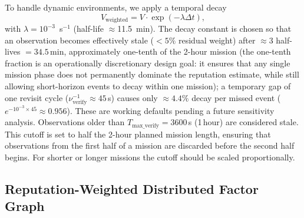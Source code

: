 \documentclass[journal,10pt,twocolumn]{IEEEtran}
\begin{document}
To handle dynamic environments, we apply a temporal decay
\begin{equation}
\label{eq:temporal-decay}
V_\text{weighted} = V \cdot \exp(-\lambda \Delta t),
\end{equation}
with $\lambda = 10^{-3}$~s$^{-1}$ (half-life $\approx$11.5~min). The decay constant is chosen so that an observation becomes effectively stale ($<5\%$ residual weight) after $\approx 3$ half-lives $=34.5$\,min, approximately one-tenth of the 2-hour mission (the one-tenth fraction is an operationally discretionary design goal: it ensures that any single mission phase does not permanently dominate the reputation estimate, while still allowing short-horizon events to decay within one mission); a temporary gap of one revisit cycle ($\nu_\text{verify}^{-1}\approx 45$\,s) causes only $\approx 4.4\%$ decay per missed event ($e^{-10^{-3}\times 45}\approx 0.956$). These are working defaults pending a future sensitivity analysis. Observations older than $T_\text{max\_verify} = 3600$\,s (1\,hour) are considered stale. This cutoff is set to half the 2-hour planned mission length, ensuring that observations from the first half of a mission are discarded before the second half begins. For shorter or longer missions the cutoff should be scaled proportionally.

\subsection{Reputation-Weighted Distributed Factor Graph}
\end{document}
